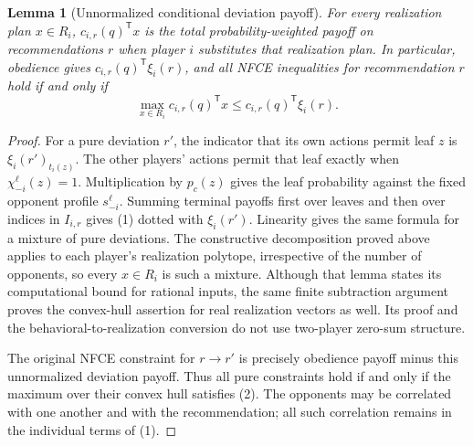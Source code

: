 \documentclass[11pt]{article}
\newtheorem{lemma}[theorem]{Lemma}
\theoremstyle{definition}
\begin{document}
\begin{lemma}[Unnormalized conditional deviation payoff]\label{lem:conditional}
For every realization plan $x\in R_i$,
$c_{i,r}(q)^{\mathsf T}x$ is the total probability-weighted payoff on
recommendations $r$ when player $i$ substitutes that realization plan.
In particular, obedience gives $c_{i,r}(q)^{\mathsf T}\xi_i(r)$, and
all NFCE inequalities for recommendation $r$ hold if and only if
\[
 \max_{x\in R_i}c_{i,r}(q)^{\mathsf T}x
 \leq c_{i,r}(q)^{\mathsf T}\xi_i(r).                 \tag{2}
\]
\end{lemma}
\begin{proof}
For a pure deviation $r'$, the indicator that its own actions permit leaf
$z$ is $\xi_i(r')_{t_i(z)}$. The other players' actions permit that leaf
exactly when $\chi_{-i}^{\ell}(z)=1$. Multiplication by $p_c(z)$ gives the
leaf probability against the fixed opponent profile $s_{-i}^{\ell}$.
Summing terminal payoffs first over leaves and then over indices in
$I_{i,r}$ gives (1) dotted with $\xi_i(r')$. Linearity gives the same
formula for a mixture of pure deviations. The constructive decomposition
proved above applies to each player's realization polytope, irrespective
of the number of opponents, so every $x\in R_i$ is such a mixture.
Although that lemma states its computational bound for rational inputs,
the same finite subtraction argument proves the convex-hull assertion for
real realization vectors as well. Its proof and the behavioral-to-realization
conversion do not use two-player zero-sum structure.

The original NFCE constraint for $r\to r'$ is precisely obedience payoff
minus this unnormalized deviation payoff. Thus all pure constraints hold
if and only if the maximum over their convex hull satisfies (2).
The opponents may be correlated with one another and with the recommendation;
all such correlation remains in the individual terms of (1).
\end{proof}
\end{document}
